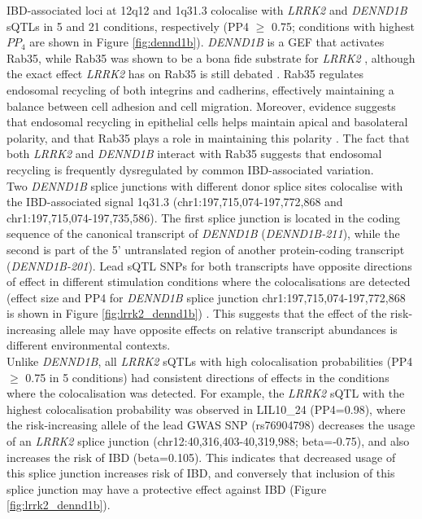 IBD-associated loci at 12q12 and 1q31.3 colocalise with \textit{LRRK2} and \textit{DENND1B} sQTLs in 5 and 21 conditions, respectively (PP4 $\geq$ 0.75; conditions with highest $PP_{4}$ are shown in Figure \ref{fig:dennd1b}). \textit{DENND1B} is a GEF that activates Rab35, while Rab35 was shown to be a bona fide substrate for \textit{LRRK2} \cite{Steger2016-yl,Bae2018-pu}, although the exact effect \textit{LRRK2} has on Rab35 is still debated \cite{Bae2018-pu,Bonet-Ponce2020-ri,Lee2021-ff}. Rab35 regulates endosomal recycling of both integrins and cadherins, effectively maintaining a balance between cell adhesion and cell migration. Moreover, evidence suggests that endosomal recycling in epithelial cells helps maintain apical and basolateral polarity, and that Rab35 plays a role in maintaining this polarity \cite{Mrozowska2016-lm,Kinoshita2020-yl}. The fact that both \textit{LRRK2} and \textit{DENND1B} interact with Rab35 suggests that endosomal recycling is frequently dysregulated by common IBD-associated variation. \\

Two \textit{DENND1B} splice junctions with different donor splice sites colocalise with the IBD-associated signal 1q31.3 (chr1:197,715,074-197,772,868 and chr1:197,715,074-197,735,586). The first splice junction is located in the coding sequence of the canonical transcript of \textit{DENND1B} (\textit{DENND1B-211}), while the second is part of the 5' untranslated region of another protein-coding transcript (\textit{DENND1B-201}). Lead sQTL SNPs for both transcripts have opposite directions of effect in different stimulation conditions where the colocalisations are detected (effect size and PP4 for \textit{DENND1B} splice junction chr1:197,715,074-197,772,868 is shown in Figure \ref{fig:lrrk2_dennd1b}) . This suggests that the effect of the risk-increasing allele may have opposite effects on relative transcript abundances is different environmental contexts. \\

Unlike \textit{DENND1B}, all \textit{LRRK2} sQTLs with high colocalisation probabilities (PP4 $\geq$ 0.75 in 5 conditions) had consistent directions of effects in the conditions where the colocalisation was detected. For example, the \textit{LRRK2} sQTL with the highest colocalisation probability was observed in LIL10\_24 (PP4=0.98), where the risk-increasing allele of the lead GWAS SNP (rs76904798) decreases the usage of an \textit{LRRK2} splice junction (chr12:40,316,403-40,319,988; beta=-0.75), and also increases the risk of IBD (beta=0.105). This indicates that decreased usage of this splice junction increases risk of IBD, and conversely that inclusion of this splice junction may have a protective effect against IBD (Figure \ref{fig:lrrk2_dennd1b}). \\

